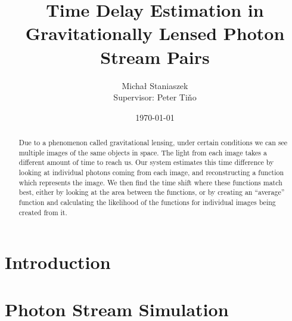 \documentclass[a4paper,11pt]{article}
\title{Time Delay Estimation in Gravitationally Lensed Photon Stream Pairs}
\author{\Large{Micha{\l} Staniaszek} \\\small{Supervisor: Peter Ti{\v{n}}o}}
\date{\today}
\begin{document}
\maketitle



\begin{abstract} Due to a phenomenon called gravitational lensing, under certain
  conditions we can see multiple images of the same objects in space. The light
  from each image takes a different amount of time to reach us. Our system
  estimates this time difference by looking at individual photons coming from
  each image, and reconstructing a function which represents the image. We then
  find the time shift where these functions match best, either by looking at the
  area between the functions, or by creating an ``average'' function and
  calculating the likelihood of the functions for individual images being
  created from it.
\end{abstract}

\section{Introduction}
\label{sec-1}
\section{Photon Stream Simulation}
\label{sec-2}
\end{document}
